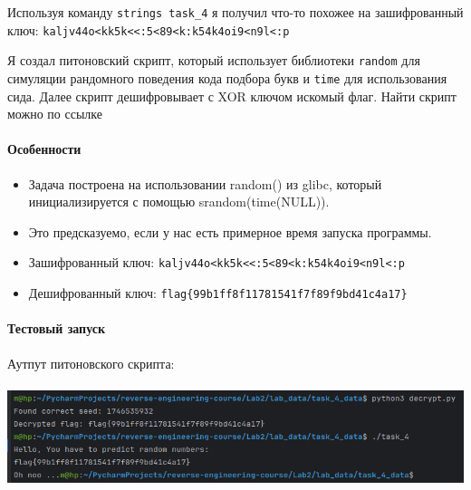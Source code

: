 Используя команду \texttt{strings task\_4} я получил что-то похожее на зашифрованный ключ: \texttt{kaljv44o<kk5k<<:5<89<k:k54k4oi9<n9l<:p}

Я создал питоновский скрипт, который использует библиотеки \texttt{random} для симуляции рандомного поведения кода
подбора букв и \texttt{time} для использования сида.
Далее скрипт дешифровывает с XOR ключом искомый флаг.
Найти скрипт можно по ссылке\cite{githublink}

\paragraph{Особенности}
\begin{itemize}
    \item Задача построена на использовании random() из glibc, который инициализируется с помощью srandom(time(NULL)).
    \item Это предсказуемо, если у нас есть примерное время запуска программы.
    \item Зашифрованный ключ: \texttt{kaljv44o<kk5k<<:5<89<k:k54k4oi9<n9l<:p}
    \item Дешифрованный ключ: \texttt{flag\{99b1ff8f11781541f7f89f9bd41c4a17\}}
\end{itemize}

\paragraph{Тестовый запуск}
Аутпут питоновского скрипта:

\paragraph{}
\includegraphics[width=1\linewidth]{static/solution_task_4}

